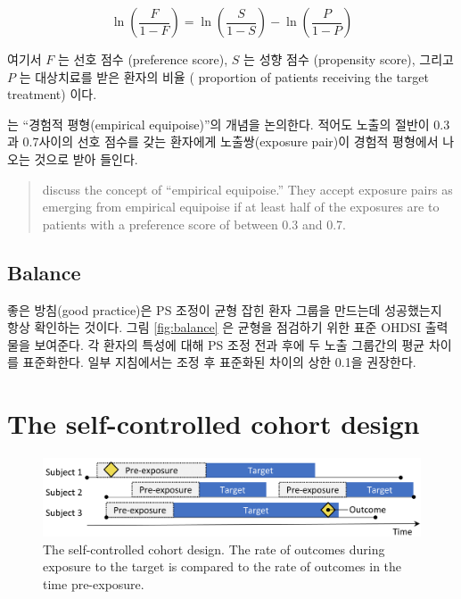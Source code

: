 \documentclass[]{book}
\begin{document}
\[\ln\left(\frac{F}{1-F}\right)=\ln\left(\frac{S}{1-S}\right)-\ln\left(\frac{P}{1-P}\right)\]

여기서 \(F\) 는 선호 점수 (preference score), \(S\) 는 성향 점수 (propensity score), 그리고 \(P\) 는 대상치료를 받은 환자의 비율 ( proportion of patients receiving the target treatment) 이다.

\citet{walker_2013} 는 ``경험적 평형(empirical equipoise)''의 개념을 논의한다. 적어도 노출의 절반이 0.3과 0.7사이의 선호 점수를 갖는 환자에게 노출쌍(exposure pair)이 경험적 평형에서 나오는 것으로 받아 들인다. 

\begin{quote}
\citet{walker_2013} discuss the concept of ``empirical equipoise.'' They accept exposure pairs as emerging from empirical equipoise if at least half of the exposures are to patients with a preference score of between 0.3 and 0.7.
\end{quote}

\hypertarget{balance}{%
\subsection{Balance}\label{balance}}

 

좋은 방침(good practice)은 PS 조정이 균형 잡힌 환자 그룹을 만드는데 성공했는지 항상 확인하는 것이다. 그림 \ref{fig:balance} 은 균형을 점검하기 위한 표준 OHDSI 출력물을 보여준다. 각 환자의 특성에 대해 PS 조정 전과 후에 두 노출 그룹간의 평균 차이를 표준화한다. 일부 지침에서는 조정 후 표준화된 차이의 상한 0.1을 권장한다. \citep{rubin_2001}

\hypertarget{the-self-controlled-cohort-design}{%
\section{The self-controlled cohort design}\label{the-self-controlled-cohort-design}}


\begin{figure}

{\centering \includegraphics[width=0.9\linewidth]{images/PopulationLevelEstimation/selfControlledCohort} 

}

\caption{The self-controlled cohort design. The rate of outcomes during exposure to the target is compared to the rate of outcomes in the time pre-exposure.}\label{fig:scc}
\end{figure}
\end{document}

